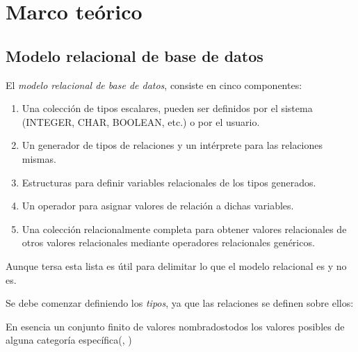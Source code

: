 \section {Marco teórico}\label{sec:marco}
\subsection {Modelo relacional de base de datos}\label{subsec:rdb}
El \emph{modelo relacional de base de datos}, consiste en cinco componentes:
\begin{enumerate}
	\item Una colección de tipos escalares, pueden ser definidos por el sistema (INTEGER, CHAR, BOOLEAN, etc.) o por el usuario.
	\item Un generador de tipos de relaciones y un intérprete para las relaciones mismas.
	\item Estructuras para definir variables relacionales de los tipos generados.
	\item Un operador para asignar valores de relación a dichas variables.
	\item Una colección relacionalmente completa para obtener valores relacionales de otros valores relacionales mediante operadores relacionales genéricos.
\end{enumerate}
Aunque tersa esta lista es útil para delimitar lo que el modelo relacional es y no es.

Se debe comenzar definiendo los \emph{tipos}, ya que las relaciones se definen sobre ellos:
\begin{displayquote}
En esencia un conjunto finito de valores nombrados\textemdash todos los valores posibles de alguna categoría específica(\citeauthor{date12}, \citeyear{date12})
\end{displayquote}

